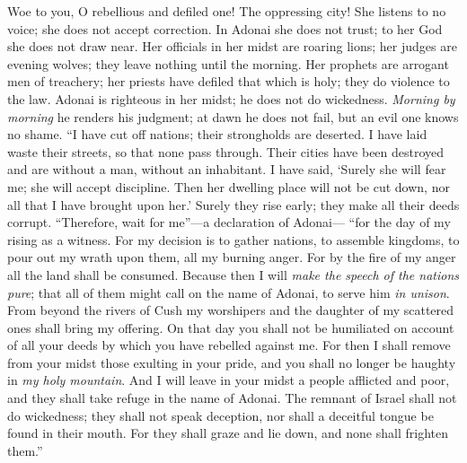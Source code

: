 \begin{biblechapter} %
 Woe to you, O rebellious and defiled one! 
The oppressing city!
\verse She listens to no voice; 
she does not accept correction. 
In Adonai she does not trust; 
to her God she does not draw near.
\verse Her officials in her midst are roaring lions; 
her judges are evening wolves; 
they leave nothing until the morning.
\verse Her prophets are arrogant men of treachery; 
her priests have defiled that which is holy; 
they do violence to the law.
\verse Adonai is righteous in her midst; 
he does not do wickedness. 
\textit{Morning by morning} he renders his judgment; 
at dawn he does not fail, 
but an evil one knows no shame.
\verse “I have cut off nations; 
their strongholds are deserted. 
I have laid waste their streets, 
so that none pass through. 
Their cities have been destroyed 
and are without a man, without an inhabitant.
\verse I have said, ‘Surely she will fear me; 
she will accept discipline. 
Then her dwelling place will not be cut down, 
nor all that I have brought upon her.’ 
Surely they rise early; 
they make all their deeds corrupt.
\verse “Therefore, wait for me”—a declaration of Adonai— 
“for the day of my rising as a witness. 
For my decision is to gather nations, 
to assemble kingdoms, 
to pour out my wrath upon them, all my burning anger. 
For by the fire of my anger all the land shall be consumed.
\verse Because then I will \textit{make the speech of the nations pure}; 
that all of them might call on the name of Adonai, 
to serve him \textit{in unison}.
\verse From beyond the rivers of Cush 
my worshipers and the daughter of my scattered ones 
shall bring my offering.
\verse On that day you shall not be humiliated 
on account of all your deeds 
by which you have rebelled against me. 
For then I shall remove from your midst 
those exulting in your pride, 
and you shall no longer be haughty 
in \textit{my holy mountain}.
\verse And I will leave in your midst 
a people afflicted and poor, 
and they shall take refuge 
in the name of Adonai.
\verse The remnant of Israel 
shall not do wickedness; 
they shall not speak deception, 
nor shall a deceitful tongue be found in their mouth. 
For they shall graze and lie down, 
and none shall frighten them.”

\end{biblechapter}
